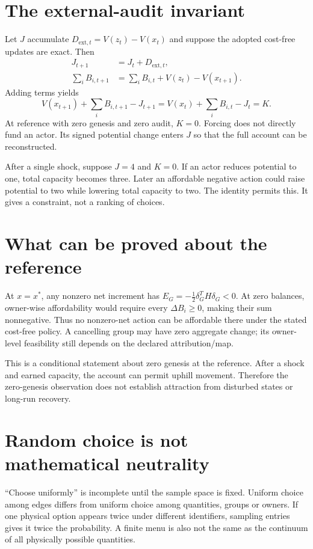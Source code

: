 \section{The external-audit invariant}
Let $J$ accumulate $D_{\mathrm{ext},t}=V(z_t)-V(x_t)$ and suppose
the adopted cost-free updates are exact. Then
\begin{align}
 J_{t+1}&=J_t+D_{\mathrm{ext},t},\\
 \sum_iB_{i,t+1}&=\sum_iB_{i,t}+V(z_t)-V(x_{t+1}).
\end{align}
Adding terms yields
\begin{equation}\label{eq:invariant}
 V(x_{t+1})+\sum_iB_{i,t+1}-J_{t+1}
 =V(x_t)+\sum_iB_{i,t}-J_t=K.
\end{equation}
At reference with zero genesis and zero audit, $K=0$. Forcing does not
directly fund an actor. Its signed potential change enters $J$ so that
the full account can be reconstructed.

After a single shock, suppose $J=4$ and $K=0$. If an actor reduces potential
to one, total capacity becomes three. Later an affordable negative action
could raise potential to two while lowering total capacity to two. The
identity permits this. It gives a constraint, not a ranking of choices.

\section{What can be proved about the reference}
At $x=x^*$, any nonzero net increment has
$E_G=-\tfrac12\delta_G^TH\delta_G<0$. At zero balances, owner-wise
affordability would require every $\Delta B_i\geq0$, making their sum
nonnegative. Thus no nonzero-net action can be affordable there under the
stated cost-free policy. A cancelling group may have zero aggregate change;
its owner-level feasibility still depends on the declared attribution/map.

This is a conditional statement about zero genesis at the reference. After
a shock and earned capacity, the account can permit uphill movement.
Therefore the zero-genesis observation does not establish attraction from
disturbed states or long-run recovery.

\section{Random choice is not mathematical neutrality}
``Choose uniformly'' is incomplete until the sample space is fixed. Uniform
choice among edges differs from uniform choice among quantities, groups or
owners. If one physical option appears twice under different identifiers,
sampling entries gives it twice the probability. A finite menu is also not
the same as the continuum of all physically possible quantities.

